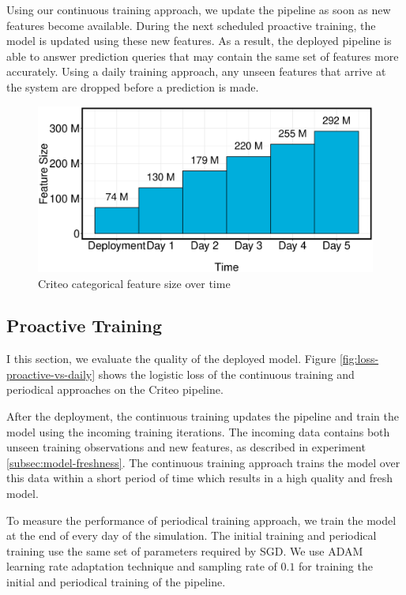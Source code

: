 Using our continuous training approach, we update the pipeline as soon as new features become available.
During the next scheduled proactive training, the model is updated using these new features.
As a result, the deployed pipeline is able to answer prediction queries that may contain the same set of features more accurately.
Using a daily training approach, any unseen features that arrive at the system are dropped before a prediction is made.

\begin{figure}[H]
\includegraphics[width=\columnwidth]{../images/experiment-results/criteo-feature-discovery-experiment.eps}
\caption{Criteo categorical feature size over time}
\label{fig:criteo-feature-discovery}
\end{figure}


\subsection{Proactive Training}
I this section, we evaluate the quality of the deployed model.
Figure \ref{fig:loss-proactive-vs-daily} shows the logistic loss of the continuous training and periodical approaches on the Criteo pipeline.

After the deployment, the continuous training updates the pipeline and train the model using the incoming training iterations.
The incoming data contains both unseen training observations and new features, as described in experiment \ref{subsec:model-freshness}.
The continuous training approach trains the model over this data within a short period of time which results in a high quality and fresh model.

To measure the performance of periodical training approach, we train the model at the end of every day of the simulation.
The initial training and periodical training use the same set of parameters required by SGD.
We use ADAM learning rate adaptation technique and sampling rate of $0.1$ for training the initial and periodical training of the pipeline.

